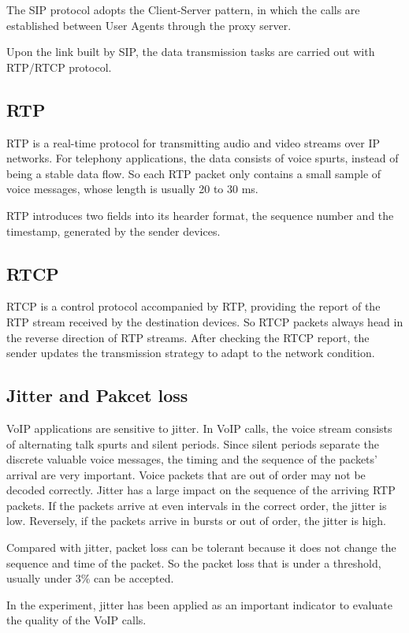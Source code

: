 The SIP protocol adopts the Client-Server pattern, in which the calls are established between User Agents through the proxy server.

Upon the link built by SIP, the data transmission tasks are carried out with RTP/RTCP protocol.

\subsection{RTP}
RTP is a real-time protocol for transmitting audio and video streams over IP networks. For telephony applications, the data consists of voice spurts, instead of being a stable data flow. So each RTP packet only contains a small sample of voice messages, whose length is usually 20 to 30 ms.

RTP introduces two fields into its hearder format, the sequence number and the timestamp, generated by the sender devices.

\subsection{RTCP}
RTCP is a control protocol accompanied by RTP, providing the report of the RTP stream received by the destination devices. So RTCP packets always head in the reverse direction of RTP streams. After checking the RTCP report, the sender updates the transmission strategy to adapt to the network condition.

\subsection{Jitter and Pakcet loss}
VoIP applications are sensitive to jitter. In VoIP calls, the voice stream consists of alternating talk spurts and silent periods. Since silent periods separate the discrete valuable voice messages, the timing and the sequence of the packets' arrival are very important. Voice packets that are out of order may not be decoded correctly. Jitter has a large impact on the sequence of the arriving RTP packets. If the packets arrive at even intervals in the correct order, the jitter is low. Reversely, if the packets arrive in bursts or out of order, the jitter is high.

Compared with jitter, packet loss can be tolerant because it does not change the sequence and time of the packet. So the packet loss that is under a threshold, usually under 3\% can be accepted.

In the experiment, jitter has been applied as an important indicator to evaluate the quality of the VoIP calls.


